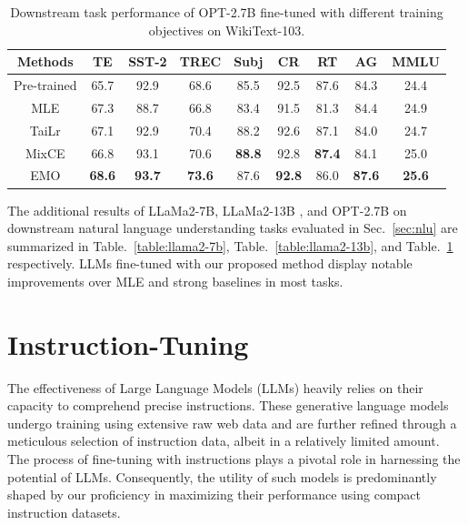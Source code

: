 \begin{table}[h!]
    \centering
    \small
    \begin{tabular}{ccccccccc}
    \toprule
    \textbf{Methods} & \textbf{TE} & \textbf{SST-2} & \textbf{TREC} & \textbf{Subj} & \textbf{CR}   & \textbf{RT} & \textbf{AG} & \textbf{MMLU} \\
    \midrule
    Pre-trained      & 65.7                    & 92.9           & 68.6          & 85.5          & 92.5          & 87.6                     & 84.3              & 24.4          \\
    MLE              & 67.3                    & 88.7           & 66.8          & 83.4          & 91.5          & 81.3                     & 84.4              & 24.9          \\
    TaiLr            & 67.1                    & 92.9           & 70.4          & 88.2          & 92.6          & 87.1                     & 84.0              & 24.7          \\
    MixCE            & 66.8                    & 93.1           & 70.6          & \textbf{88.8} & 92.8          & \textbf{87.4}                     & 84.1              & 25.0          \\
    \midrule
    EMO             & \textbf{68.6}           & \textbf{93.7}  & \textbf{73.6} & 87.6          & \textbf{92.8} & 86.0                     & \textbf{87.6}     & \textbf{25.6}          \\
    \bottomrule
    \end{tabular}
    \caption{Downstream task performance of OPT-2.7B fine-tuned with different training objectives on WikiText-103.}
    \label{table:opt2.7b}
\end{table}
The additional results of LLaMa2-7B, LLaMa2-13B , and OPT-2.7B on downstream natural language understanding tasks evaluated in Sec.~\ref{sec:nlu} are summarized in Table.~\ref{table:llama2-7b}, Table.~\ref{table:llama2-13b}, and Table.~\ref{table:opt2.7b} respectively. LLMs fine-tuned with our proposed method display notable improvements over MLE and strong baselines in most tasks.

\section{Instruction-Tuning}
\label{appendix:instruction}
The effectiveness of Large Language Models (LLMs) heavily relies on their capacity to comprehend precise instructions. These generative language models undergo training using extensive raw web data and are further refined through a meticulous selection of instruction data, albeit in a relatively limited amount. The process of fine-tuning with instructions plays a pivotal role in harnessing the potential of LLMs. Consequently, the utility of such models is predominantly shaped by our proficiency in maximizing their performance using compact instruction datasets.

